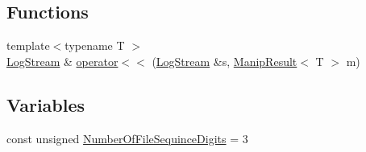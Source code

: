 \subsection*{Functions}
\begin{DoxyCompactItemize}
\item 
{\footnotesize template$<$typename T $>$ }\\\hyperlink{classkisscpp_1_1_log_stream}{Log\-Stream} \& \hyperlink{namespacekisscpp_a7a056a2a9cc68e577ced326d1ebf86c1}{operator$<$$<$} (\hyperlink{classkisscpp_1_1_log_stream}{Log\-Stream} \&s, \hyperlink{classkisscpp_1_1_manip_result}{Manip\-Result}$<$ T $>$ m)
\end{DoxyCompactItemize}
\subsection*{Variables}
\begin{DoxyCompactItemize}
\item 
const unsigned \hyperlink{namespacekisscpp_a743621016edf95f7afda64b2da3bb576}{Number\-Of\-File\-Sequince\-Digits} = 3
\end{DoxyCompactItemize}


